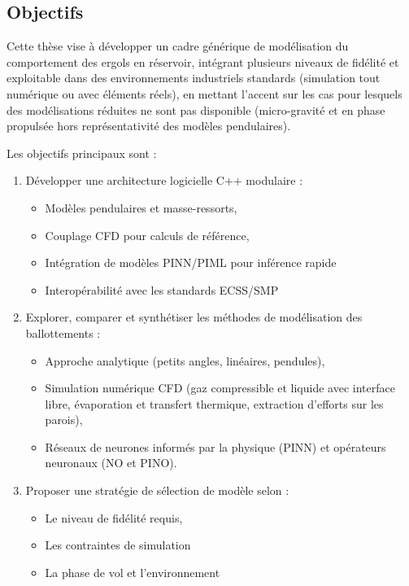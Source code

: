 \documentclass[12pt]{article}
\begin{document}
	\subsection*{Objectifs}
	
	Cette thèse vise à développer un cadre générique de modélisation du comportement des ergols en réservoir, intégrant plusieurs niveaux de fidélité et exploitable dans des environnements industriels standards (simulation tout numérique ou avec éléments réels), en mettant l'accent sur les cas pour lesquels des modélisations réduites ne sont pas disponible (micro-gravité et en phase propulsée hors représentativité des modèles pendulaires).
	
	Les objectifs principaux sont :
	\begin{enumerate}
		\item Développer une architecture logicielle C++ modulaire :
		\begin{itemize}
			\item Modèles pendulaires et masse-ressorts,
			\item Couplage CFD pour calculs de référence,
			\item Intégration de modèles PINN/PIML pour inférence rapide
			\item Interopérabilité avec les standards ECSS/SMP
		\end{itemize}
		\item Explorer, comparer et synthétiser les méthodes de modélisation des ballottements :
		\begin{itemize}
			\item Approche analytique (petits angles, linéaires, pendules),
			\item Simulation numérique CFD (gaz compressible et liquide avec interface libre, évaporation et transfert thermique, extraction d'efforts sur les parois),
			\item Réseaux de neurones informés par la physique (PINN) et opérateurs neuronaux (NO et PINO).
		\end{itemize}
		\item Proposer une stratégie de sélection de modèle selon :
		\begin{itemize}
			\item Le niveau de fidélité requis,
			\item Les contraintes de simulation
			\item La phase de vol et l'environnement
		\end{itemize}
	\end{enumerate}
	
\end{document}

